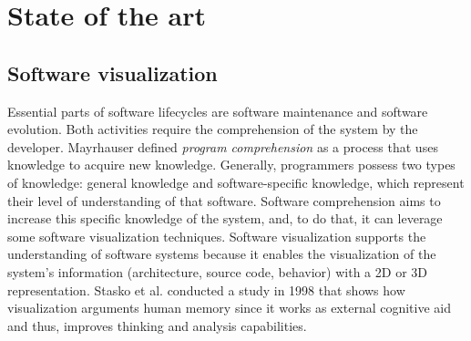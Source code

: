 
\chapter[Related Works]{State of the art}
\graphicspath{ {images/stateOfArt} }



\section{Software visualization}





Essential parts of software lifecycles are software maintenance and software evolution. 
Both activities require the comprehension of the system by the developer. 
Mayrhauser \cite{VonMayrhauser1995} defined {\it program comprehension} as a process that uses knowledge to acquire new knowledge. 
Generally, programmers possess two types of knowledge: general knowledge and software-specific knowledge, which represent their level of understanding of that software. 
Software comprehension aims to increase this specific knowledge of the system, and, to do that, it can leverage some software visualization techniques. 
Software visualization supports the understanding of software systems because it enables the visualization of the system's information (architecture, source code, behavior) with a 2D or 3D representation. 
Stasko et al.\cite{Stasko2008} conducted a study in 1998 that shows how visualization arguments human memory since it works as external cognitive aid and thus, improves thinking and analysis capabilities. \\




